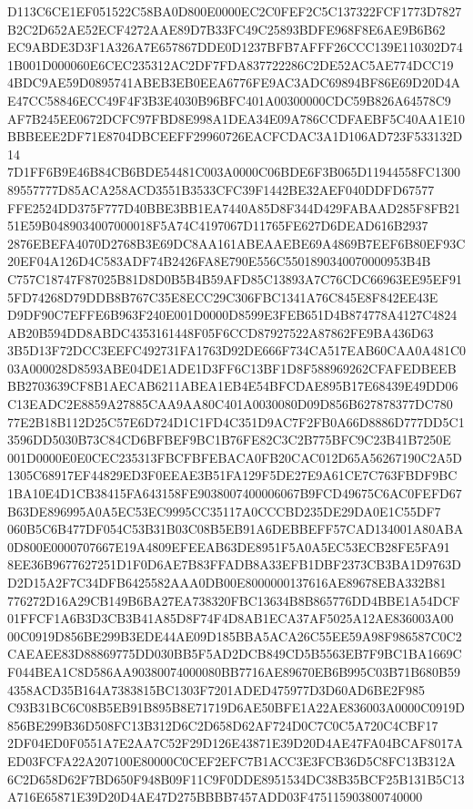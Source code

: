 \documentclass[UTF8,fontset=fandol,zihao=-4,a4paper]{ctexart}
\begin{document}
{{D113C6CE1EF051522C58BA0D800E0000EC2C0FEF2C5C137322FCF1773D7827B2C2D652AE52ECF4272AAE89D7B33FC49C25893BDFE968F8E6AE9B6B62
EC9ABDE3D3F1A326A7E657867DDE0D1237BFB7AFFF26CCC139E110302D741B001D000060E6CEC235312AC2DF7FDA837722286C2DE52AC5AE774DCC19
4BDC9AE59D0895741ABEB3EB0EEA6776FE9AC3ADC69894BF86E69D20D4AE47CC58846ECC49F4F3B3E4030B96BFC401A00300000CDC59B826A64578C9
AF7B245EE0672DCFC97FBD8E998A1DEA34E09A786CCDFAEBF5C40AA1E10BBBEEE2DF71E8704DBCEEFF29960726EACFCDAC3A1D106AD723F533132D14
7D1FF6B9E46B84CB6BDE54481C003A0000C06BDE6F3B065D11944558FC130089557777D85ACA258ACD3551B3533CFC39F1442BE32AEF040DDFD67577
FFE2524DD375F777D40BBE3BB1EA7440A85D8F344D429FABAAD285F8FB2151E59B0489034007000018F5A74C4197067D11765FE627D6DEAD616B2937
2876EBEFA4070D2768B3E69DC8AA161ABEAAEBE69A4869B7EEF6B80EF93C20EF04A126D4C583ADF74B2426FA8E790E556C5501890340070000953B4B
C757C18747F87025B81D8D0B5B4B59AFD85C13893A7C76CDC66963EE95EF915FD74268D79DDB8B767C35E8ECC29C306FBC1341A76C845E8F842EE43E
D9DF90C7EFFE6B963F240E001D0000D8599E3FEB651D4B874778A4127C4824AB20B594DD8ABDC4353161448F05F6CCD87927522A87862FE9BA436D63
3B5D13F72DCC3EEFC492731FA1763D92DE666F734CA517EAB60CAA0A481C003A000028D8593ABE04DE1ADE1D3FF6C13BF1D8F588969262CFAFEDBEEB
BB2703639CF8B1AECAB6211ABEA1EB4E54BFCDAE895B17E68439E49DD06C13EADC2E8859A27885CAA9AA80C401A0030080D09D856B627878377DC780
77E2B18B112D25C57E6D724D1C1FD4C351D9AC7F2FB0A66D8886D777DD5C13596DD5030B73C84CD6BFBEF9BC1B76FE82C3C2B775BFC9C23B41B7250E
001D0000E0E0CEC235313FBCFBFEBACA0FB20CAC012D65A56267190C2A5D1305C68917EF44829ED3F0EEAE3B51FA129F5DE27E9A61CE7C763FBDF9BC
1BA10E4D1CB38415FA643158FE9038007400006067B9FCD49675C6AC0FEFD67B63DE896995A0A5EC53EC9995CC35117A0CCCBD235DE29DA0E1C55DF7
060B5C6B477DF054C53B31B03C08B5EB91A6DEBBEFF57CAD134001A80ABA0D800E0000707667E19A4809EFEEAB63DE8951F5A0A5EC53ECB28FE5FA91
8EE36B9677627251D1F0D6AE7B83FFADB8A33EFB1DBF2373CB3BA1D9763DD2D15A2F7C34DFB6425582AAA0DB00E8000000137616AE89678EBA332B81
776272D16A29CB149B6BA27EA738320FBC13634B8B865776DD4BBE1A54DCF01FFCF1A6B3D3CB3B41A85D8F74F4D8AB1ECA37AF5025A12AE836003A00
00C0919D856BE299B3EDE44AE09D185BBA5ACA26C55EE59A98F986587C0C2CAEAEE83D88869775DD030BB5F5AD2DCB849CD5B5563EB7F9BC1BA1669C
F044BEA1C8D586AA90380074000080BB7716AE89670EB6B995C03B71B680B594358ACD35B164A7383815BC1303F7201ADED475977D3D60AD6BE2F985
C93B31BC6C08B5EB91B895B8E71719D6AE50BFE1A22AE836003A0000C0919D856BE299B36D508FC13B312D6C2D658D62AF724D0C7C0C5A720C4CBF17
2DF04ED0F0551A7E2AA7C52F29D126E43871E39D20D4AE47FA04BCAF8017AED03FCFA22A207100E80000C0CEF2EFC7B1ACC3E3FCB36D5C8FC13B312A
6C2D658D62F7BD650F948B09F11C9F0DDE8951534DC38B35BCF25B131B5C13A716E65871E39D20D4AE47D275BBBB7457ADD03F475115903800740000
}}
\end{document}
